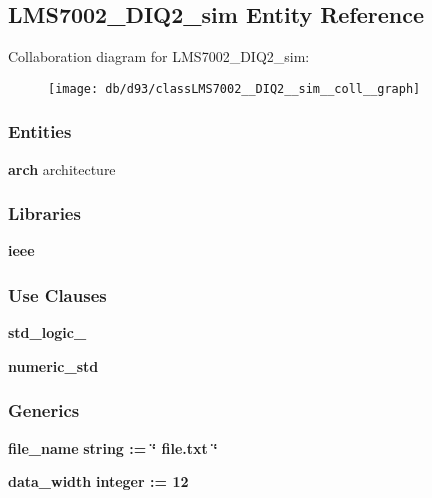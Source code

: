 \subsection{L\+M\+S7002\+\_\+\+D\+I\+Q2\+\_\+sim Entity Reference}
\label{classLMS7002__DIQ2__sim}


Collaboration diagram for L\+M\+S7002\+\_\+\+D\+I\+Q2\+\_\+sim\+:\nopagebreak
\begin{figure}[H]
\begin{center}
\leavevmode
\texttt{[image: db/d93/classLMS7002\_\_DIQ2\_\_sim\_\_coll\_\_graph]}
\end{center}
\end{figure}
\subsubsection*{Entities}
\begin{DoxyCompactItemize}
\item 
{\bf arch} architecture
\end{DoxyCompactItemize}
\subsubsection*{Libraries}
 \begin{DoxyCompactItemize}
\item 
{\bf ieee} 
\end{DoxyCompactItemize}
\subsubsection*{Use Clauses}
 \begin{DoxyCompactItemize}
\item 
{\bf std\+\_\+logic\+\_}   
\item 
{\bf numeric\+\_\+std}   
\end{DoxyCompactItemize}
\subsubsection*{Generics}
 \begin{DoxyCompactItemize}
\item 
{\bf file\+\_\+name} {\bfseries {\bfseries \textcolor{comment}{string}\textcolor{vhdlchar}{ }\textcolor{vhdlchar}{ }\textcolor{vhdlchar}{\+:}\textcolor{vhdlchar}{=}\textcolor{vhdlchar}{ }\textcolor{vhdlchar}{ }\textcolor{vhdlchar}{ }\textcolor{vhdlchar}{ }\textcolor{keyword}{\char`\"{} file.\+txt \char`\"{}}\textcolor{vhdlchar}{ }}}
\item 
{\bf data\+\_\+width} {\bfseries {\bfseries \textcolor{comment}{integer}\textcolor{vhdlchar}{ }\textcolor{vhdlchar}{ }\textcolor{vhdlchar}{\+:}\textcolor{vhdlchar}{=}\textcolor{vhdlchar}{ }\textcolor{vhdlchar}{ } \textcolor{vhdldigit}{12} \textcolor{vhdlchar}{ }}}
\end{DoxyCompactItemize}
